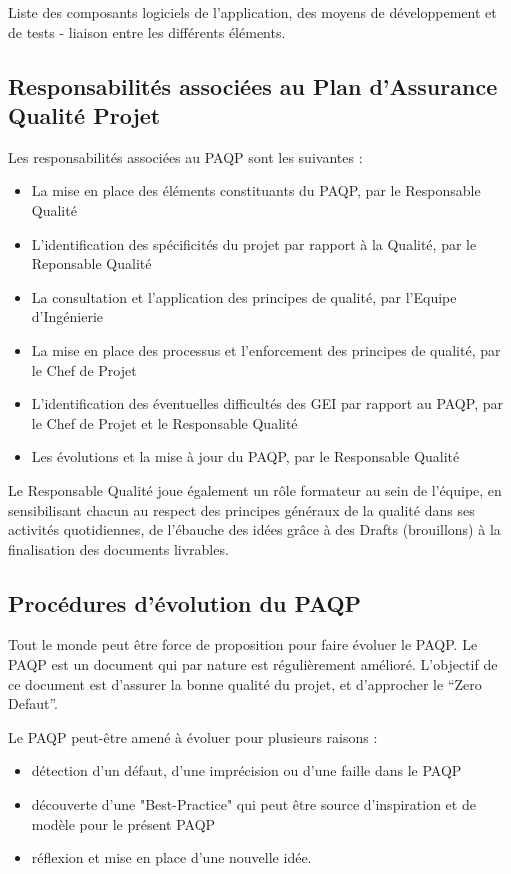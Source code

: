 \documentclass[a4paper]{article}
\begin{document}
Liste des composants logiciels de l'application, des moyens de développement et de tests - liaison entre les différents éléments.

\subsection{Responsabilités associées au Plan d'Assurance Qualité Projet}

Les responsabilités associées au PAQP sont les suivantes :

\begin{itemize}
\item La mise en place des éléments constituants du PAQP, par le Responsable Qualité
\item L'identification des spécificités du projet par rapport à la Qualité, par le Reponsable Qualité
\item La consultation et l'application des principes de qualité, par l'Equipe d'Ingénierie
\item La mise en place des processus et l'enforcement des principes de qualité, par le Chef de Projet
\item L'identification des éventuelles difficultés des GEI par rapport au PAQP, par le Chef de Projet et le Responsable Qualité
\item Les évolutions et la mise à jour du PAQP, par le Responsable Qualité
\end{itemize}

Le Responsable Qualité joue également un rôle formateur au sein de l'équipe, en sensibilisant chacun au respect des principes généraux de la qualité dans ses activités quotidiennes, de l'ébauche des idées grâce à des Drafts (brouillons) à la finalisation des documents livrables.

\subsection{Procédures d'évolution du PAQP}

Tout le monde peut être force de proposition pour faire évoluer le PAQP. Le PAQP est un document qui par nature est régulièrement amélioré. L'objectif de ce document est d'assurer la bonne qualité du projet, et d'approcher le ``Zero Defaut''.

Le PAQP peut-être amené à évoluer pour plusieurs raisons :

\begin{itemize}
\item détection d'un défaut, d'une imprécision ou d'une faille dans le PAQP
\item découverte d'une "Best-Practice" qui peut être source d'inspiration et de modèle pour le présent PAQP
\item réflexion et mise en place d'une nouvelle idée.
\end{itemize}
\end{document}
